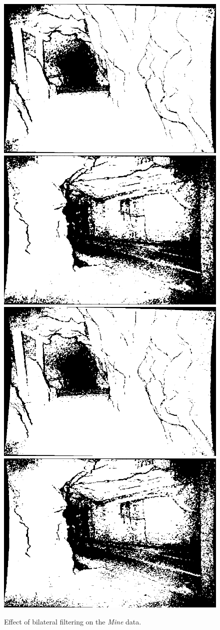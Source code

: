 \begin{figure}[H]
    \includegraphics[width=0.25\linewidth]{chapter06/results/conv_images/lehrpfad/flexion/bl/0000.png}%
    \includegraphics[width=0.25\linewidth]{chapter06/results/conv_images/lehrpfad/flexion/bl/0360.png}%
    \includegraphics[width=0.25\linewidth]{chapter06/results/conv_images/lehrpfad/bearing/bl/0000.png}%
    \includegraphics[width=0.25\linewidth]{chapter06/results/conv_images/lehrpfad/bearing/bl/0360.png}%
    \caption{Effect of bilateral filtering on the \emph{Mine} data.}
\end{figure}
